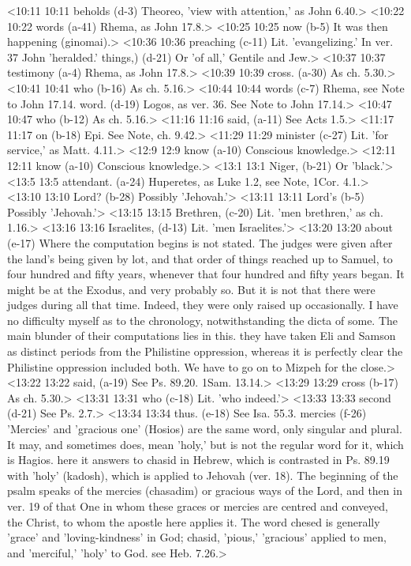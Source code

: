 <10:11 10:11  beholds (d-3)  Theoreo, 'view with attention,' as John 6.40.>
<10:22 10:22  words (a-41) Rhema, as John 17.8.>
<10:25 10:25  now (b-5)  It was then happening (ginomai).>
<10:36 10:36  preaching (c-11)  Lit. 'evangelizing.' In ver. 37 John 'heralded.'
  things,) (d-21)  Or 'of all,' Gentile and Jew.>
<10:37 10:37  testimony (a-4)  Rhema, as John 17.8.>
<10:39 10:39  cross. (a-30)  As ch. 5.30.>
<10:41 10:41  who (b-16) As ch. 5.16.>
<10:44 10:44  words (c-7)  Rhema, see Note to John 17.14.
  word. (d-19)  Logos, as ver. 36. See Note to John 17.14.>
<10:47 10:47  who (b-12)  As ch. 5.16.>
<11:16 11:16  said, (a-11)  See Acts 1.5.>
<11:17 11:17  on (b-18)  Epi. See Note, ch. 9.42.>
<11:29 11:29  minister (c-27)  Lit. 'for service,' as Matt. 4.11.>
<12:9 12:9  know (a-10) Conscious knowledge.>
<12:11 12:11  know (a-10)  Conscious knowledge.>
<13:1 13:1  Niger, (b-21)  Or 'black.'>
<13:5 13:5  attendant. (a-24)  Huperetes, as Luke 1.2, see Note, 1Cor. 4.1.>
<13:10 13:10  Lord? (b-28) Possibly 'Jehovah.'>
<13:11 13:11  Lord's (b-5)  Possibly 'Jehovah.'>
<13:15 13:15  Brethren, (c-20)  Lit. 'men brethren,' as ch. 1.16.>
<13:16 13:16  Israelites, (d-13)  Lit. 'men Israelites.'>
<13:20 13:20  about (e-17)  Where the computation begins is not stated. The judges were  given after the land's being given by lot, and that order of  things reached up to Samuel, to four hundred and fifty years,  whenever that four hundred and fifty years began. It might be  at the Exodus, and very probably so. But it is not that there  were judges during all that time. Indeed, they were only raised  up occasionally. I have no difficulty myself as to the  chronology, notwithstanding the dicta of some. The main blunder  of their computations lies in this. they have taken Eli and  Samson as distinct periods from the Philistine oppression,  whereas it is perfectly clear the Philistine oppression  included both. We have to go on to Mizpeh for the close.>
<13:22 13:22  said, (a-19)  See Ps. 89.20. 1Sam. 13.14.>
<13:29 13:29  cross (b-17)  As ch. 5.30.>
<13:31 13:31  who (c-18)  Lit. 'who indeed.'>
<13:33 13:33  second (d-21)  See Ps. 2.7.>
<13:34 13:34  thus. (e-18)  See Isa. 55.3.
  mercies (f-26)  'Mercies' and 'gracious one' (Hosios) are the same word,  only singular and plural. It may, and sometimes does, mean  'holy,' but is not the regular word for it, which is Hagios.  here it answers to chasid in Hebrew, which is contrasted in  Ps. 89.19 with 'holy' (kadosh), which is applied to Jehovah  (ver. 18). The beginning of the psalm speaks of the mercies  (chasadim) or gracious ways of the Lord, and then in ver. 19  of that One in whom these graces or mercies are centred and  conveyed, the Christ, to whom the apostle here applies it. The  word chesed is generally 'grace' and 'loving-kindness' in  God; chasid, 'pious,' 'gracious' applied to men, and  'merciful,' 'holy' to God. see Heb. 7.26.>
